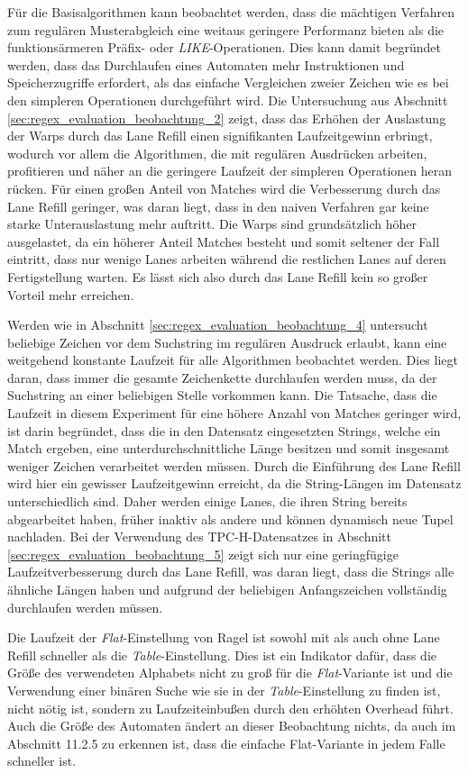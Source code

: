 Für die Basisalgorithmen kann beobachtet werden, dass die mächtigen Verfahren zum regulären Musterabgleich eine weitaus geringere Performanz bieten als die funktionsärmeren Präfix- oder \emph{LIKE}-Operationen.
Dies kann damit begründet werden, dass das Durchlaufen eines Automaten mehr Instruktionen und Speicherzugriffe erfordert, als das einfache Vergleichen zweier Zeichen wie es bei den simpleren Operationen durchgeführt wird.
Die Untersuchung aus Abschnitt \ref{sec:regex_evaluation_beobachtung_2} zeigt, dass das Erhöhen der Auslastung der Warps durch das Lane Refill einen signifikanten Laufzeitgewinn erbringt, wodurch vor allem die Algorithmen, die mit regulären Ausdrücken arbeiten, profitieren und näher an die geringere Laufzeit der simpleren Operationen heran rücken.
Für einen großen Anteil von Matches wird die Verbesserung durch das Lane Refill geringer, was daran liegt, dass in den naiven Verfahren gar keine starke Unterauslastung mehr auftritt.
Die Warps sind grundsätzlich höher ausgelastet, da ein höherer Anteil Matches besteht und somit seltener der Fall eintritt, dass nur wenige Lanes arbeiten während die restlichen Lanes auf deren Fertigstellung warten.
Es lässt sich also durch das Lane Refill kein so großer Vorteil mehr erreichen.

Werden wie in Abschnitt \ref{sec:regex_evaluation_beobachtung_4} untersucht beliebige Zeichen vor dem Suchstring im regulären Ausdruck erlaubt, kann eine weitgehend konstante Laufzeit für alle Algorithmen beobachtet werden.
Dies liegt daran, dass immer die gesamte Zeichenkette durchlaufen werden muss, da der Suchstring an einer beliebigen Stelle vorkommen kann.
Die Tatsache, dass die Laufzeit in diesem Experiment für eine höhere Anzahl von Matches geringer wird, ist darin begründet, dass die in den Datensatz eingesetzten Strings, welche ein Match ergeben, eine unterdurchschnittliche Länge besitzen und somit insgesamt weniger Zeichen verarbeitet werden müssen.
Durch die Einführung des Lane Refill wird hier ein gewisser Laufzeitgewinn erreicht, da die String-Längen im Datensatz unterschiedlich sind.
Daher werden einige Lanes, die ihren String bereits abgearbeitet haben, früher inaktiv als andere und können dynamisch neue Tupel nachladen.
Bei der Verwendung des TPC-H-Datensatzes in Abschnitt \ref{sec:regex_evaluation_beobachtung_5} zeigt sich nur eine geringfügige Laufzeitverbesserung durch das Lane Refill, was daran liegt, dass die Strings alle ähnliche Längen haben und aufgrund der beliebigen Anfangszeichen vollständig durchlaufen werden müssen.

Die Laufzeit der \emph{Flat}-Einstellung von Ragel ist sowohl mit als auch ohne Lane Refill schneller als die \emph{Table}-Einstellung.
Dies ist ein Indikator dafür, dass die Größe des verwendeten Alphabets nicht zu groß für die \emph{Flat}-Variante ist und die Verwendung einer binären Suche wie sie in der \emph{Table}-Einstellung zu finden ist, nicht nötig ist, sondern zu Laufzeiteinbußen durch den erhöhten Overhead führt.
Auch die Größe des Automaten ändert an dieser Beobachtung nichts, da auch im Abschnitt 11.2.5 zu erkennen ist, dass die einfache Flat-Variante in jedem Falle schneller ist.